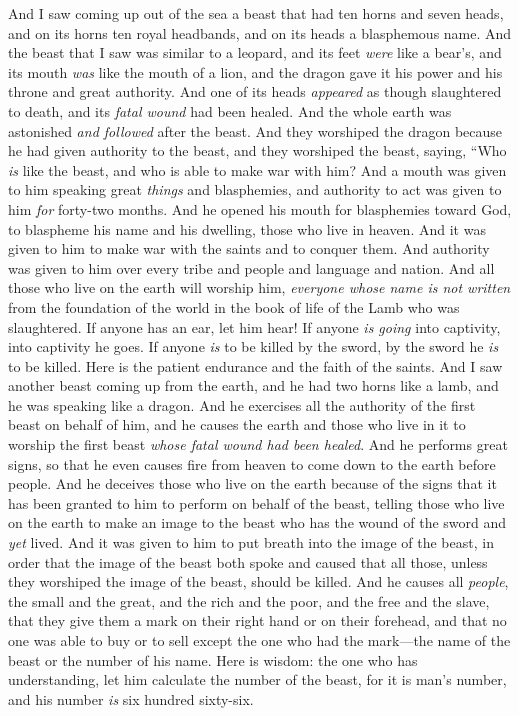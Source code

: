 \begin{biblechapter} %
 And I saw coming up out of the sea a beast that had ten horns and seven heads, and on its horns ten royal headbands, and on its heads a blasphemous name.
\verse And the beast that I saw was similar to a leopard, and its feet \textit{were} like a bear’s, and its mouth \textit{was} like the mouth of a lion, and the dragon gave it his power and his throne and great authority.
\verse And one of its heads \textit{appeared} as though slaughtered to death, and its \textit{fatal wound} had been healed. And the whole earth was astonished \textit{and followed} after the beast.
\verse And they worshiped the dragon because he had given authority to the beast, and they worshiped the beast, saying, “Who \textit{is} like the beast, and who is able to make war with him?
\verse And a mouth was given to him speaking great \textit{things} and blasphemies, and authority to act was given to him \textit{for} forty-two months.
\verse And he opened his mouth for blasphemies toward God, to blaspheme his name and his dwelling, those who live in heaven.
\verse And it was given to him to make war with the saints and to conquer them. And authority was given to him over every tribe and people and language and nation.
\verse And all those who live on the earth will worship him, \textit{everyone whose name is not written} from the foundation of the world in the book of life of the Lamb who was slaughtered.
\verse If anyone has an ear, let him hear!
\verse If anyone \textit{is going} into captivity, into captivity he goes. 
If anyone \textit{is} to be killed by the sword, by the sword he \textit{is} to be killed. Here is the patient endurance and the faith of the saints.
 And I saw another beast coming up from the earth, and he had two horns like a lamb, and he was speaking like a dragon.
\verse And he exercises all the authority of the first beast on behalf of him, and he causes the earth and those who live in it to worship the first beast \textit{whose fatal wound had been healed}.
\verse And he performs great signs, so that he even causes fire from heaven to come down to the earth before people.
\verse And he deceives those who live on the earth because of the signs that it has been granted to him to perform on behalf of the beast, telling those who live on the earth to make an image to the beast who has the wound of the sword and \textit{yet} lived.
\verse And it was given to him to put breath into the image of the beast, in order that the image of the beast both spoke and caused that all those, unless they worshiped the image of the beast, should be killed.
\verse And he causes all \textit{people}, the small and the great, and the rich and the poor, and the free and the slave, that they give them a mark on their right hand or on their forehead,
\verse and that no one was able to buy or to sell except the one who had the mark—the name of the beast or the number of his name.
\verse Here is wisdom: the one who has understanding, let him calculate the number of the beast, for it is man’s number, and his number \textit{is} six hundred sixty-six.
\end{biblechapter}

